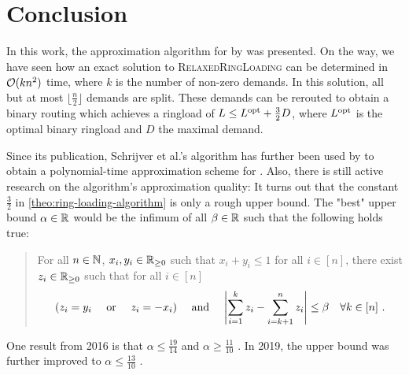 \section{Conclusion}

In this work, the approximation algorithm for \RL by \citet{schrijver99} was presented.
On the way, we have seen how an exact solution to \textsc{RelaxedRingLoading} can be determined in $\mathcal{O}(k n^2)$ time, where $k$ is the number of non-zero demands.
In this solution, all but at most $\lfloor \frac{n}{2} \rfloor$ demands are split.
These demands can be rerouted to obtain a binary routing which achieves a ringload of $L \leq L^{\mathrm{opt}} + \frac{3}{2}D$, where $L^{\mathrm{opt}}$ is the optimal binary ringload and $D$ the maximal demand.

Since its publication, Schrijver et al.'s  algorithm has further been used by \citet{khanna97} to obtain a polynomial-time approximation scheme for \RL.
Also, there is still active research on the algorithm's approximation quality:
It turns out that the constant $\frac{3}{2}$ in \cref{theo:ring-loading-algorithm} is only a rough upper bound.
The "best" upper bound $\alpha \in \mathbb{R}$ would be the infimum of all $\beta \in \mathbb{R}$ such that the following holds true:
\begin{quote}
	For all $n \in \mathbb{N}$, $x_i, y_i \in \mathbb{R}_{\geq 0}$ such that $x_i + y_i \leq 1$ for all $i \in [n]$, there exist $z_i \in \mathbb{R}_{\geq 0}$ such that for all $i \in [n]$
	\begin{equation}
		(z_i = y_i \quad \text{ or } \quad z_i = -x_i) 
		\quad \text{ and } \quad \abs{\sum_{i=1}^k z_i - \sum_{i = k+1}^n z_i} \leq \beta \quad \forall k \in [n] \ .
	\end{equation}
\end{quote}
One result from 2016 is that $\alpha \leq \frac{19}{14}$ and $\alpha \geq \frac{11}{10}$ \cite{skutella16}.
In 2019, the upper bound was further improved to $\alpha \leq \frac{13}{10}$ \cite{daubel19}.
